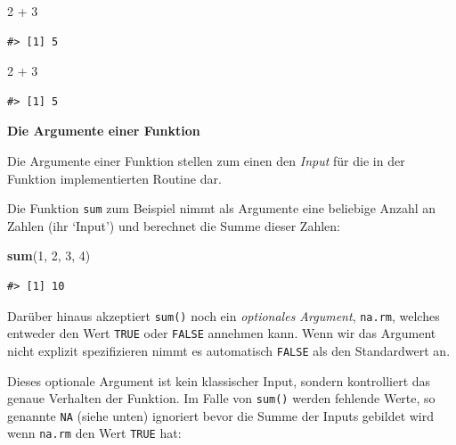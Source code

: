 \documentclass[]{tufte-book}
\newenvironment{Shaded}{}{}
\newcommand{\KeywordTok}[1]{\textcolor[rgb]{0.00,0.44,0.13}{\textbf{#1}}}
\newcommand{\DecValTok}[1]{\textcolor[rgb]{0.25,0.63,0.44}{#1}}
\newcommand{\StringTok}[1]{\textcolor[rgb]{0.25,0.44,0.63}{#1}}
\newcommand{\OperatorTok}[1]{\textcolor[rgb]{0.40,0.40,0.40}{#1}}
\newcommand{\NormalTok}[1]{#1}
\begin{document}
\begin{Shaded}
\begin{Highlighting}[]
\DecValTok{2} \OperatorTok{+}\StringTok{ }\DecValTok{3}
\end{Highlighting}
\end{Shaded}

\begin{verbatim}
#> [1] 5
\end{verbatim}

\begin{Shaded}
\begin{Highlighting}[]
\DecValTok{2} \OperatorTok{+}\StringTok{ }\DecValTok{3}
\end{Highlighting}
\end{Shaded}

\begin{verbatim}
#> [1] 5
\end{verbatim}

\textbf{Die Argumente einer Funktion}

Die Argumente einer Funktion stellen zum einen den \emph{Input} für die
in der Funktion implementierten Routine dar.

Die Funktion \texttt{sum} zum Beispiel nimmt als Argumente eine
beliebige Anzahl an Zahlen (ihr `Input') und berechnet die Summe dieser
Zahlen:

\begin{Shaded}
\begin{Highlighting}[]
\KeywordTok{sum}\NormalTok{(}\DecValTok{1}\NormalTok{, }\DecValTok{2}\NormalTok{, }\DecValTok{3}\NormalTok{, }\DecValTok{4}\NormalTok{)}
\end{Highlighting}
\end{Shaded}

\begin{verbatim}
#> [1] 10
\end{verbatim}

Darüber hinaus akzeptiert \texttt{sum()} noch ein \emph{optionales
Argument}, \texttt{na.rm}, welches entweder den Wert \texttt{TRUE} oder
\texttt{FALSE} annehmen kann. Wenn wir das Argument nicht explizit
spezifizieren nimmt es automatisch \texttt{FALSE} als den Standardwert
an.

Dieses optionale Argument ist kein klassischer Input, sondern
kontrolliert das genaue Verhalten der Funktion. Im Falle von
\texttt{sum()} werden fehlende Werte, so genannte \texttt{NA} (siehe
unten) ignoriert bevor die Summe der Inputs gebildet wird wenn
\texttt{na.rm} den Wert \texttt{TRUE} hat:
\end{document}
